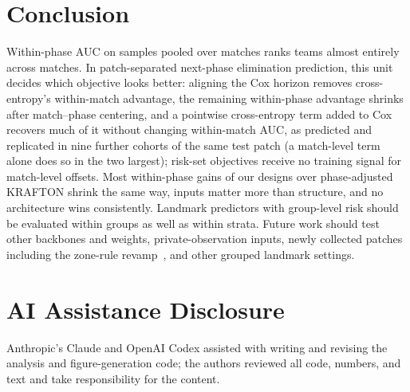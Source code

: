 \documentclass[sigconf,anonymous,nonacm]{acmart}
\begin{document}
\section{Conclusion}
\label{sec:conclusion}
Within-phase AUC on samples pooled over matches ranks teams almost entirely across matches. In patch-separated next-phase elimination prediction, this unit decides which objective looks better: aligning the Cox horizon removes cross-entropy's within-match advantage, the remaining within-phase advantage shrinks after match--phase centering, and a pointwise cross-entropy term added to Cox recovers much of it without changing within-match AUC, as predicted and replicated in nine further cohorts of the same test patch (a match-level term alone does so in the two largest); risk-set objectives receive no training signal for match-level offsets. Most within-phase gains of our designs over phase-adjusted KRAFTON shrink the same way, inputs matter more than structure, and no architecture wins consistently. Landmark predictors with group-level risk should be evaluated within groups as well as within strata. Future work should test other backbones and weights, private-observation inputs, newly collected patches including the zone-rule revamp~\cite{PUBGBlueZone2026}, and other grouped landmark settings.

\section*{AI Assistance Disclosure}
Anthropic's Claude and OpenAI Codex assisted with writing and revising the analysis and figure-generation code; the authors reviewed all code, numbers, and text and take responsibility for the content.



\end{document}
